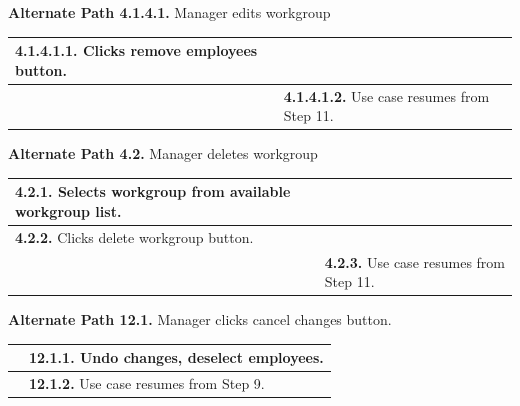 \documentclass[letterpaper,12pt]{report}
\begin{document}
{\centering \textbf{Alternate Path 4.1.4.1.}
\linebreak Manager edits workgroup
\begin{center}
\xuchead
\begin{tabular}{| p{8.5cm} | p{8.5cm} |}
\hline
\textbf{4.1.4.1.1.} Clicks remove employees button. & \\
\hline
& \textbf{4.1.4.1.2.} Use case\index{Use Case} resumes from Step 11. \\
\hline
\end{tabular}
\end{center}


\centering \textbf{Alternate Path 4.2.}
\linebreak Manager deletes workgroup
\begin{center}
\xuchead
\begin{tabular}{| p{8.5cm} | p{8.5cm} |}
\hline
\textbf{4.2.1.} Selects workgroup from available workgroup list. & \\
\hline
\textbf{4.2.2.} Clicks delete workgroup button. & \\
\hline
& \textbf{4.2.3.} Use case\index{Use Case} resumes from Step 11. \\
\hline
\end{tabular}
\end{center}

\pagebreak

\centering \textbf{Alternate Path 12.1.}
\linebreak Manager clicks cancel changes button.
\begin{center}
\xuchead
\begin{tabular}{| p{8.5cm} | p{8.5cm} |}
\hline
& \textbf{12.1.1.} Undo changes, deselect employees. \\
\hline
& \textbf{12.1.2.} Use case\index{Use Case} resumes from Step 9. \\
\hline
\end{tabular}
\end{center}

}

\pagebreak
\end{document}
